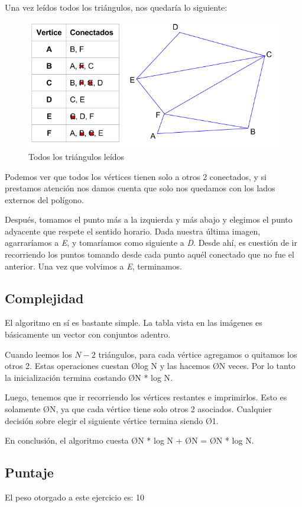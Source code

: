 Una vez leídos todos los triángulos, nos quedaría lo siguiente:

\begin{figure}[H]\centering\includegraphics[scale=0.7]{Imagenes/ej1/Imagen_F.png}\caption{Todos los triángulos leídos}\end{figure}

Podemos ver que todos los vértices tienen solo a otros 2 conectados, y si prestamos atención nos damos cuenta que solo nos quedamos con los lados externos del polígono.

Después, tomamos el punto más a la izquierda y más abajo y elegimos el punto adyacente que respete el sentido horario. Dada nuestra última imagen, agarraríamos a \textit{E}, y tomaríamos como siguiente a \textit{D}. Desde ahí, es cuestión de ir recorriendo los puntos tomando desde cada punto aquél conectado que no fue el anterior. Una vez que volvimos a \textit{E}, terminamos.

\subsection{Complejidad}
El algoritmo en sí es bastante simple. La tabla vista en las imágenes es básicamente un vector con conjuntos adentro.

Cuando leemos los $N - 2$ triángulos, para cada vértice agregamos o quitamos los otros 2. Estas operaciones cuestan \O{log N} y las hacemos \O{N} veces. Por lo tanto la inicialización termina costando \O{N * log N}.

Luego, tenemos que ir recorriendo los vértices restantes e imprimirlos. Esto es solamente \O{N}, ya que cada vértice tiene solo otros 2 asociados. Cualquier decisión sobre elegir el siguiente vértice termina siendo \O{1}.

En conclusión, el algoritmo cuesta \O{N * log N} + \O{N} = \O{N * log N}.

\subsection{Puntaje}
El peso otorgado a este ejercicio es: 10

